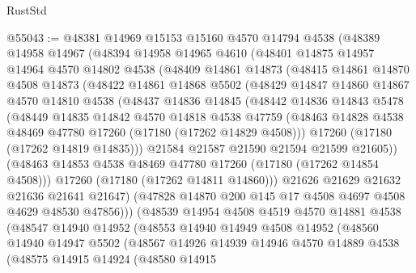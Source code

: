 \begin{lexlean}{RustStd}
\begin{coremodule}
@55043 := @48381
    @14969
    @15153
    @15160
    @4570
    @14794
    @4538
    (@48389
      @14958
      @14967
      (@48394
        @14958
        @14965
        @4610
        (@48401
          @14875
          @14957
          @14964
          @4570
          @14802
          @4538
          (@48409
            @14861
            @14873
            (@48415
              @14861
              @14870
              @4508
              @14873
              (@48422
                @14861
                @14868
                @5502
                (@48429
                  @14847
                  @14860
                  @14867
                  @4570
                  @14810
                  @4538
                  (@48437
                    @14836
                    @14845
                    (@48442
                      @14836
                      @14843
                      @5478
                      (@48449
                        @14835
                        @14842
                        @4570
                        @14818
                        @4538
                        @47759
                        (@48463 @14828 @4538 @48469 @47780 @17260 (@17180 (@17262 @14829 @4508)))
                        @17260
                        (@17180 (@17262 @14819 @14835)))
                      @21584
                      @21587
                      @21590
                      @21594
                      @21599
                      @21605))
                  (@48463 @14853 @4538 @48469 @47780 @17260 (@17180 (@17262 @14854 @4508)))
                  @17260
                  (@17180 (@17262 @14811 @14860)))
                @21626
                @21629
                @21632
                @21636
                @21641
                @21647)
              (@47828 @14870 @200 @145 @17 @4508 @4697 @4508 @4629 @48530 @47856)))
          (@48539
            @14954
            @4508
            @4519
            @4570
            @14881
            @4538
            (@48547
              @14940
              @14952
              (@48553
                @14940
                @14949
                @4508
                @14952
                (@48560
                  @14940
                  @14947
                  @5502
                  (@48567
                    @14926
                    @14939
                    @14946
                    @4570
                    @14889
                    @4538
                    (@48575
                      @14915
                      @14924
                      (@48580
                        @14915

\end{coremodule}
\end{lexlean}
